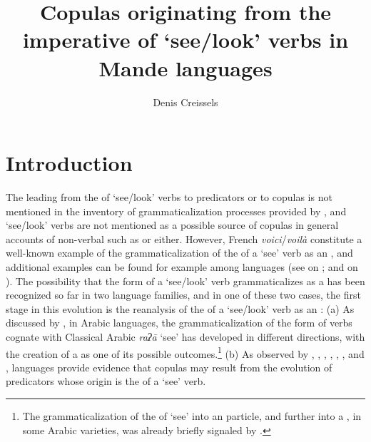 \documentclass[output=paper]{langsci/langscibook}
\title{Copulas originating from the imperative of ‘see\slash look’ verbs in Mande languages}
\author{%
Denis Creissels\affiliation{University of Lyon}  
}
\begin{document}
  
  

\section{Introduction}\label{sec:creissels:1}

The  leading from the  of ‘see\slash look’ verbs to  predicators or to copulas is not mentioned in the inventory of grammaticalization processes provided by \citet{Heine2002}, and ‘see\slash look’ verbs are not mentioned as a possible source of copulas in general accounts of non-verbal  such as \citet{Hengeveld1992} or \citet{Pustet2003} either. However, French \textit{voici}/\textit{voilà} constitute a well-known example of the grammaticalization of the  of a ‘see’ verb as an  , and additional examples can be found for example among  languages (see \citet[380--382]{Hellwig2011} on ; \citet[468--469]{Jaggar2001} and \citet[181--182]{Newman2000} on ). The possibility that the  form of a ‘see\slash look’ verb grammaticalizes as a  has been recognized so far in two language families, and in one of these two cases, the first stage in this evolution is the reanalysis of the  of a ‘see\slash look’ verb as an  :
(a)  As discussed by \citet{Taine-Cheikh2013}, in Arabic languages, the grammaticalization of the  form of verbs cognate with Classical Arabic \textit{raʔā} ‘see’ has developed in different directions, with the creation of a  as one of its possible outcomes.\footnote{The grammaticalization of the  of ‘see’ into an  particle, and further into a , in some Arabic varieties, was already briefly signaled by \citet[43]{Rubin2005}.}
(b)  As observed by \citet{Westermann1930}, \citet{Monteil1939}, \citet{Heydorn1940-1941}, \citet{Heydorn1949-1950}, \citet{Welmers1974}, \citet{Creissels1981}, and \citet{Tröbs2003},  languages provide evidence that copulas may result from the evolution of  predicators whose origin is the  of a ‘see’ verb.
\end{document}
